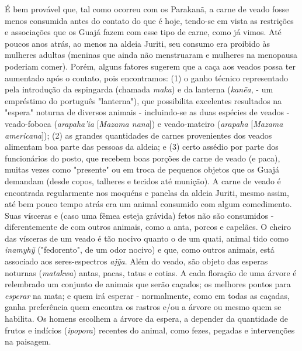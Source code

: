 É bem provável que, tal como ocorreu com os Parakanã, a carne de veado
fosse menos consumida antes do contato do que é hoje, tendo-se em vista
as restrições e associações que os Guajá fazem com esse tipo de carne,
como já vimos. Até poucos anos atrás, ao menos na aldeia Juriti, seu
consumo era proibido às mulheres adultas (meninas que ainda não
menstruaram e mulheres na menopausa poderiam comer). Porém, alguns
fatores sugerem que a caça aos veados possa ter aumentado após o
contato, pois encontramos: (1) o ganho técnico representado pela
introdução da espingarda (chamada \emph{maka}) e da lanterna
(\emph{kanẽa}, - um empréstimo do português "lanterna"), que possibilita
excelentes resultados na "espera" noturna de diversos animais -
incluindo-se as duas espécies de veados - veado-foboca
(\emph{arapaha'ia} {[}\emph{Mazama nana}{]}) e veado-mateiro
(\emph{arapaha} {[}\emph{Mazama americana}{]}); (2) as grandes
quantidades de carnes provenientes dos veados alimentam boa parte das
pessoas da aldeia; e (3) certo assédio por parte dos funcionários do
posto, que recebem boas porções de carne de veado (e paca), muitas vezes
como "presente" ou em troca de pequenos objetos que os Guajá demandam
(desde copos, talheres e tecidos até munição). A carne de veado é
encontrada regularmente nos moquéns e panelas da aldeia Juriti, mesmo
assim, até bem pouco tempo atrás era um animal consumido com algum
comedimento. Suas vísceras e (caso uma fêmea esteja grávida) fetos não
são consumidos - diferentemente de com outros animais, como a anta,
porcos e capelães. O cheiro das vísceras de um veado é tão nocivo quanto
o de um quati, animal tido como \emph{inamyhỹ} ("fedorento", de um odor
nocivo) e que, como outros animais, está associado aos seres-espectros
\emph{ajỹa}. Além do veado, são objeto das esperas noturnas
(\emph{matakwa}) antas, pacas, tatus e cotias. A cada floração de uma
árvore é relembrado um conjunto de animais que serão caçados; os
melhores pontos para \emph{esperar} na mata; e quem irá esperar -
normalmente, como em todas as caçadas, ganha preferência quem encontra
os rastros e/ou a árvore ou mesmo quem se habilita. Os homens escolhem a
árvore da espera, a depender da quantidade de frutos e indícios
(\emph{ipopora}) recentes do animal, como fezes, pegadas e intervenções
na paisagem.

